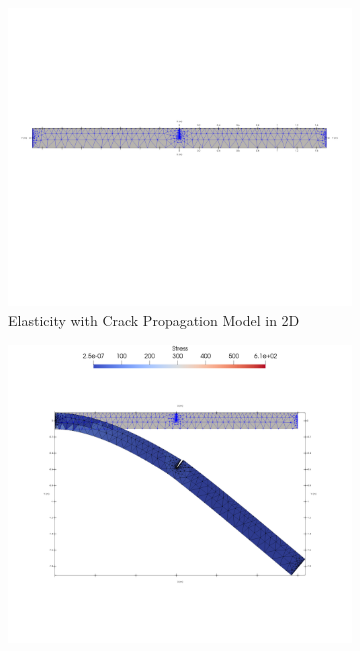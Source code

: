 \documentclass[a4paper,11pt]{article}
\begin{document}
\begin{figure}[h!]
	\begin{subfigure}[b]{0.5\linewidth}
		\centering
		\includegraphics[width=\linewidth]{picture/conference/crackmodel2d}
		\caption{Elasticity with Crack Propagation Model in 2D}
		\label{fig:2dcrack}
	\end{subfigure}
	\quad
	\begin{subfigure}[b]{0.5\linewidth}
		\centering
		\includegraphics[width=\linewidth]{picture/conference/cracksol2d}

\end{subfigure}
\end{figure}
\end{document}
